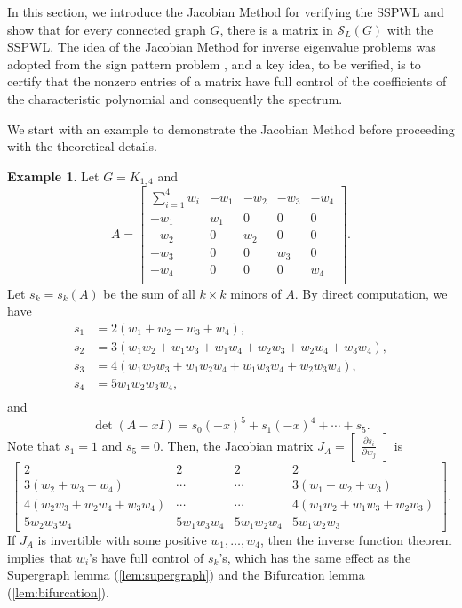 \documentclass{article}
\theoremstyle{definition}
\newtheorem{example}[theorem]{Example}
\newcommand{\mptn}{\mathcal{S}}
\begin{document}
In this section, we introduce the Jacobian Method for verifying the SSPWL and show that for every connected graph $G$, there is a matrix in $\mptn_L(G)$ with the SSPWL.  The idea of the Jacobian Method for inverse eigenvalue problems was adopted from the sign pattern problem \cite{DJOvdD00,GB13,bifur}, and a key idea, to be verified, is to certify that the nonzero entries of a matrix have full control of the coefficients of the characteristic polynomial and consequently the spectrum.  

We start with an example to demonstrate the Jacobian Method before proceeding with the theoretical details.

\begin{example}
\label{ex:k14jm}
Let $G = K_{1,4}$ and 
\[
    A = \begin{bmatrix}
    \sum_{i=1}^4 w_i & -w_1 & -w_2 & -w_3 & -w_4 \\
    -w_1 & w_1 & 0 & 0 & 0 \\
    -w_2 & 0 & w_2 & 0 & 0 \\
    -w_3 & 0 & 0 & w_3 & 0 \\
    -w_4 & 0 & 0 & 0 & w_4 \\
    \end{bmatrix}.
\]
Let $s_k = s_k(A)$ be the sum of all $k\times k$ minors of $A$.  By direct computation, we have 
\[
    \begin{aligned}
        s_1 &= 2(w_1 + w_2 + w_3 + w_4), \\
        s_2 &= 3(w_1w_2 + w_1w_3 + w_1w_4 + w_2w_3 + w_2w_4 + w_3w_4), \\
        s_3 &= 4(w_1w_2w_3 + w_1w_2w_4 + w_1w_3w_4 + w_2w_3w_4), \\
        s_4 &= 5w_1w_2w_3w_4, \\
    \end{aligned}
\]
and 
\[
    \det(A - xI) = s_0(-x)^5 + s_1(-x)^4 + \cdots + s_5.
\]
Note that $s_1 = 1$ and $s_5 = 0$. Then, the Jacobian matrix $J_A = \begin{bmatrix} \frac{\partial s_i}{\partial w_j} \end{bmatrix}$ is 
\[
    \begin{bmatrix}
        2 & 2 & 2 & 2 \\
        3(w_2 + w_3 + w_4) & \cdots & \cdots & 3(w_1 + w_2 + w_3) \\
        4(w_2w_3 + w_2w_4 + w_3w_4) & \cdots & \cdots & 4(w_1w_2 + w_1w_3 + w_2w_3) \\
        5w_2w_3w_4 & 5w_1w_3w_4 & 5w_1w_2w_4 & 5w_1w_2w_3
    \end{bmatrix}.
\]
If $J_A$ is invertible with some positive $w_1, \ldots, w_4$, then the inverse function theorem implies that $w_i$'s have full control of $s_k$'s, which has the same effect as the Supergraph lemma (\cref{lem:supergraph}) and the Bifurcation lemma (\cref{lem:bifurcation}).  
\end{example}
\end{document}
